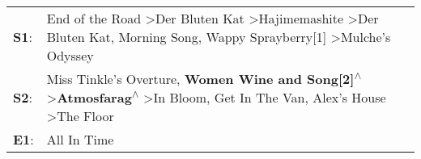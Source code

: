 \begin{supertabular}{p{0.03\textwidth}p{0.92\textwidth}}
 \textbf{S1}:  &                  End of the Road\textsuperscript{} \textgreater \enspace Der Bluten Kat\textsuperscript{} \textgreater \enspace Hajimemashite\textsuperscript{} \textgreater \enspace Der Bluten Kat\textsuperscript{}, \enspace Morning Song\textsuperscript{}, \enspace Wappy Sprayberry[1]\textsuperscript{} \textgreater \enspace Mulche's Odyssey\textsuperscript{}  \enspace  \\
 \textbf{S2}:  &  Miss Tinkle's Overture\textsuperscript{}, \enspace \textbf{Women Wine and Song[2]\textsuperscript{$\wedge$}} \textgreater \enspace \textbf{Atmosfarag\textsuperscript{$\wedge$}} \textgreater \enspace In Bloom\textsuperscript{}, \enspace Get In The Van\textsuperscript{}, \enspace Alex's House\textsuperscript{} \textgreater \enspace The Floor\textsuperscript{}  \enspace  \\
 \textbf{E1}:  &                                                                                                                                                                                                                                                                                                                                            All In Time\textsuperscript{}  \enspace  \\
\end{supertabular}
